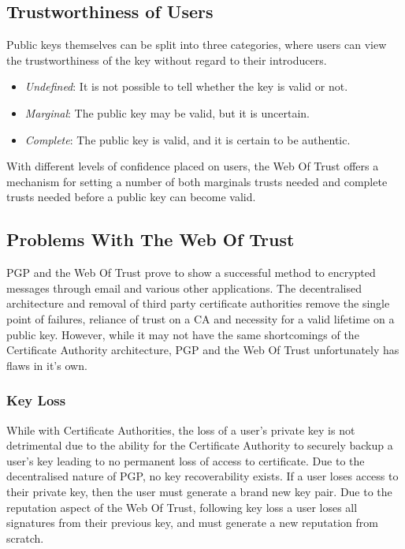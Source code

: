 \subsection{Trustworthiness of Users}

Public keys themselves can be split into three categories, where users can view the trustworthiness of the key without regard to their introducers.
\begin{itemize}
  \item \textit{Undefined}: It is not possible to tell whether the key is valid or not.
  \item \textit{Marginal}: The public key may be valid, but it is uncertain.
  \item \textit{Complete}: The public key is valid, and it is certain to be authentic.
\end{itemize}

With different levels of confidence placed on users, the Web Of Trust offers a mechanism for setting a number of both marginals trusts needed and complete trusts needed before a public key can become valid.

\subsection{Problems With The Web Of Trust}
PGP and the Web Of Trust prove to show a successful method to encrypted messages through email and various other applications. The decentralised architecture and removal of third party certificate authorities remove the single point of failures, reliance of trust on a CA and necessity for a valid lifetime on a public key. However, while it may not have the same shortcomings of the Certificate Authority architecture, PGP and the Web Of Trust unfortunately has flaws in it’s own.

\subsubsection{Key Loss}
While with Certificate Authorities, the loss of a user’s private key is not detrimental due to the ability for the Certificate Authority to securely backup a user’s key leading to no permanent loss of access to certificate. Due to the decentralised nature of PGP,  no key recoverability exists. If a user loses access to their private key, then the user must generate a brand new key pair. Due to the reputation aspect of the Web Of Trust, following key loss a user loses all signatures from their previous key,  and must generate a new reputation from scratch.

